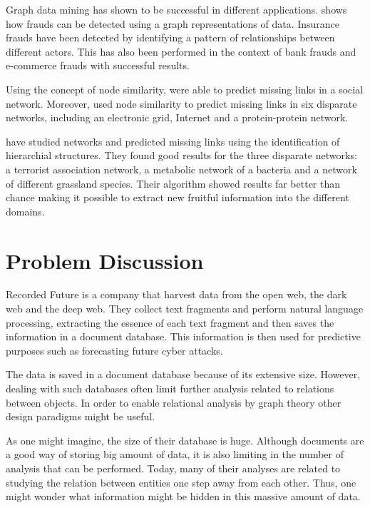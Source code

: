 Graph data mining has shown to be successful in different applications. \citet{bankFraud} shows how frauds can be detected using a graph representations of data. Insurance frauds have been detected by identifying a pattern of relationships between different actors. This has also been performed in the context of bank frauds and e-commerce frauds with successful results. 

Using the concept of node similarity, \citet{Liben-Nowell2003} were able to predict missing links in a social network. Moreover, \citet{Zhou2009} used node similarity to predict missing links in six disparate networks, including an electronic grid, Internet and a protein-protein network.

\citet{clauset2008Hierarchicalstructure} have studied networks and predicted missing links using the identification of hierarchial structures. They found good results for the three disparate networks: a terrorist association network, a metabolic network of a bacteria and a network of different grassland species. Their algorithm showed results far better than chance making it possible to extract new fruitful information into the different domains. 

\section{Problem Discussion}
Recorded Future is a company that harvest data from the open web, the dark web and the deep web. They collect text fragments and perform natural language processing, extracting the essence of each text fragment and then saves the information in a document database. This information is then used for predictive purposes such as forecasting future cyber attacks.

The data is saved in a document database because of its extensive size. However, dealing with such databases often limit further analysis related to relations between objects. In order to enable relational analysis by graph theory other design paradigms might be useful.

As one might imagine, the size of their database is huge. Although documents are a good way of storing big amount of data, it is also limiting in the number of analysis that can be performed. Today, many of their analyses are related to studying the relation between entities one step away from each other. Thus, one might wonder what information might be hidden in this massive amount of data.

